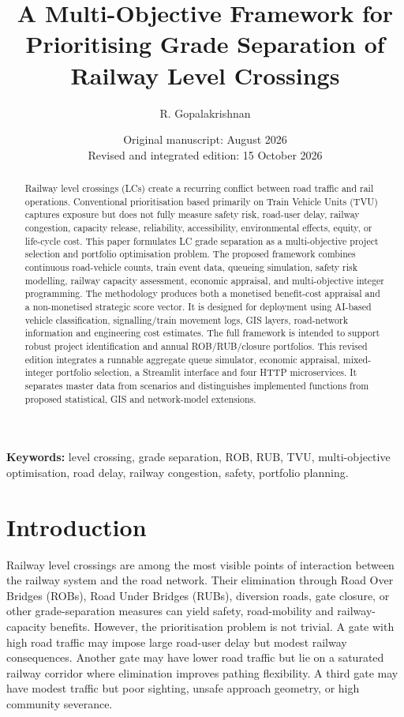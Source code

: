 \documentclass[11pt,a4paper]{article}
\title{A Multi-Objective Framework for Prioritising Grade Separation of Railway Level Crossings}
\author{R. Gopalakrishnan}
\date{Original manuscript: August 2026\\Revised and integrated edition: 15 October 2026}
\begin{document}
\maketitle

\begin{abstract}
Railway level crossings (LCs) create a recurring conflict between road traffic and rail operations. Conventional prioritisation based primarily on Train Vehicle Units (TVU) captures exposure but does not fully measure safety risk, road-user delay, railway congestion, capacity release, reliability, accessibility, environmental effects, equity, or life-cycle cost. This paper formulates LC grade separation as a multi-objective project selection and portfolio optimisation problem. The proposed framework combines continuous road-vehicle counts, train event data, queueing simulation, safety risk modelling, railway capacity assessment, economic appraisal, and multi-objective integer programming. The methodology produces both a monetised benefit-cost appraisal and a non-monetised strategic score vector. It is designed for deployment using AI-based vehicle classification, signalling/train movement logs, GIS layers, road-network information and engineering cost estimates. The full framework is intended to support robust project identification and annual ROB/RUB/closure portfolios. This revised edition integrates a runnable aggregate queue simulator, economic appraisal, mixed-integer portfolio selection, a Streamlit interface and four HTTP microservices. It separates master data from scenarios and distinguishes implemented functions from proposed statistical, GIS and network-model extensions.
\end{abstract}

\noindent\textbf{Keywords:} level crossing, grade separation, ROB, RUB, TVU, multi-objective optimisation, road delay, railway congestion, safety, portfolio planning.

\section{Introduction}

Railway level crossings are among the most visible points of interaction between the railway system and the road network. Their elimination through Road Over Bridges (ROBs), Road Under Bridges (RUBs), diversion roads, gate closure, or other grade-separation measures can yield safety, road-mobility and railway-capacity benefits. However, the prioritisation problem is not trivial. A gate with high road traffic may impose large road-user delay but modest railway consequences. Another gate may have lower road traffic but lie on a saturated railway corridor where elimination improves pathing flexibility. A third gate may have modest traffic but poor sighting, unsafe approach geometry, or high community severance.
\end{document}
